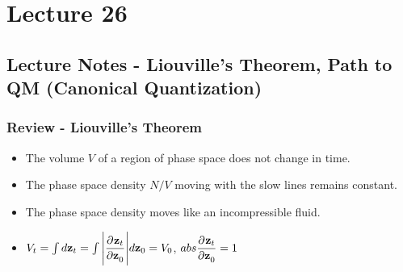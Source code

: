 \documentclass[../PHYS306Notes.tex]{subfiles}
\begin{document}
\section{Lecture 26}
\subsection{Lecture Notes - Liouville's Theorem, Path to QM (Canonical Quantization)}
\subsubsection{Review - Liouville's Theorem}
\begin{itemize}
    \item The volume $V$ of a region of phase space does not change in time.
    \item The phase space density $N/V$ moving with the slow lines remains constant.
    \item The phase space density moves like an incompressible fluid.
    \item $V_t = \int d\v{z}_t = \int\abs{\dpd{\v{z}_t}{\v{z}_0}}d\v{z}_0 = V_0$, $abs{\dpd{\v{z}_t}{\v{z}_0}} = 1$
\end{itemize}
\end{document}
